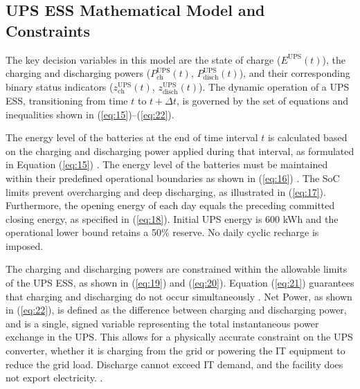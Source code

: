 \documentclass[lettersize,journal]{IEEEtran}
\begin{document}
\subsection{UPS ESS Mathematical Model and Constraints}

 The key decision variables in this model are the state of charge ($E^{\mathrm{UPS}}(t)$), the charging and discharging powers ($P^{\mathrm{UPS}}_{\mathrm{ch}}(t)$, $P^{\mathrm{UPS}}_{\mathrm{disch}}(t)$), and their corresponding binary status indicators ($z^{\mathrm{UPS}}_{\mathrm{ch}}(t)$, $z^{\mathrm{UPS}}_{\mathrm{disch}}(t)$). The dynamic operation of a UPS ESS, transitioning from time \(t\) to \(t+\Delta t\), is governed by the set of equations and inequalities shown in (\ref{eq:15})--(\ref{eq:22}).

The energy level of the batteries at the end of time interval \(t\) is calculated based on the charging and discharging power applied during that interval, as formulated in Equation (\ref{eq:15}) \cite{Takci2024Chapter}.
The energy level of the batteries must be maintained within their predefined operational boundaries as shown in (\ref{eq:16}) \cite{Takci2024Chapter}. The SoC limits prevent overcharging and deep discharging, as illustrated in (\ref{eq:17}). Furthermore, the opening energy of each day equals the preceding committed closing energy, as specified in (\ref{eq:18}). Initial UPS energy is 600 kWh and the operational lower bound retains a 50\% reserve. No daily cyclic recharge is imposed.

The charging and discharging powers are constrained within the allowable limits of the UPS ESS, as shown in (\ref{eq:19}) and (\ref{eq:20}). Equation (\ref{eq:21}) guarantees that charging and discharging do not occur simultaneously \cite{Takci2024Chapter}. Net Power, as shown in (\ref{eq:22}), is defined as the difference between charging and discharging power, and is a single, signed variable representing the total instantaneous power exchange in the UPS. This allows for a physically accurate constraint on the UPS converter, whether it is charging from the grid or powering the IT equipment to reduce the grid load. Discharge cannot exceed IT demand, and the facility does not export electricity. \cite{Hashmi2024ArXiv}.
\end{document}
